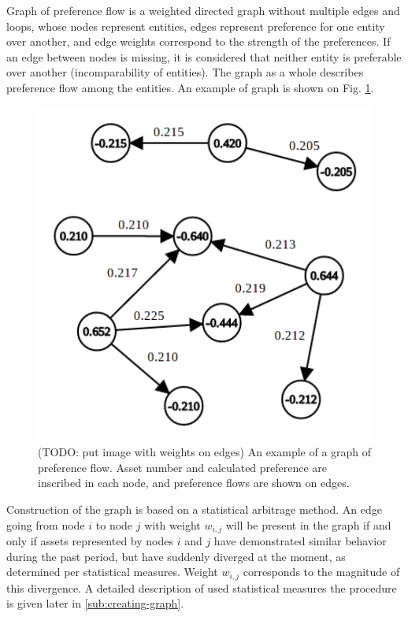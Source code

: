 \documentclass[letterpaper, 10pt, conference]{ieeeconf}
\begin{document}
  Graph of preference flow is a weighted directed graph without multiple edges and loops, whose nodes represent entities, edges represent preference for one entity over another, and edge weights correspond to the strength of the preferences.
  If an edge between nodes is missing, it is considered that neither entity is preferable over another (incomparability of entities).
  The graph as a whole describes preference flow among the entities.
  An example of graph is shown on Fig. \ref{fig:graph}.
  
  \begin{figure}[h]
    \centering
    \includegraphics[width=\columnwidth]{graphics/graph.pdf}
    \caption{(TODO: put image with weights on edges) An example of a graph of preference flow. Asset number and calculated preference are inscribed in each node, and preference flows are shown on edges.}
    \label{fig:graph}
  \end{figure}

  Construction of the graph is based on a statistical arbitrage method.
  An edge going from node $i$ to node $j$ with weight $w_{i,j}$ will be present in the graph if and only if assets represented by nodes $i$ and $j$ have demonstrated similar behavior during the past period, but have suddenly diverged at the moment, as determined per statistical measures.
  Weight $w_{i,j}$ corresponds to the magnitude of this divergence.  
  A detailed description of used statistical measures the procedure is given later in \ref{sub:creating-graph}.
  
\end{document}
